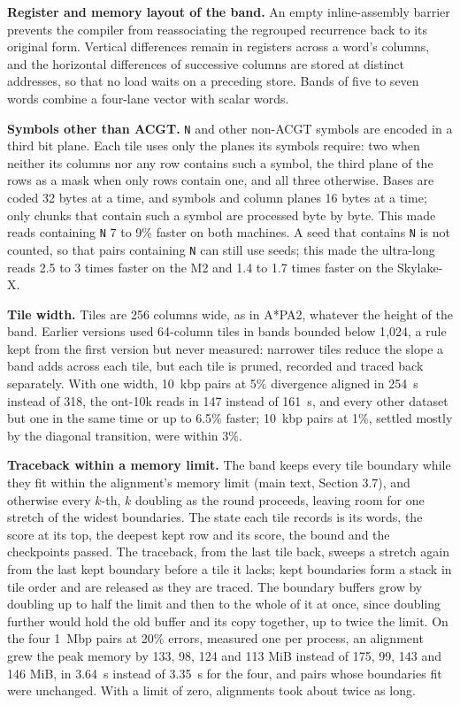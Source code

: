 \documentclass[10pt]{article}
\begin{document}
\textbf{Register and memory layout of the band.} An empty inline-assembly barrier prevents the compiler from reassociating the regrouped recurrence back to its original form. Vertical differences remain in registers across a word's columns, and the horizontal differences of successive columns are stored at distinct addresses, so that no load waits on a preceding store. Bands of five to seven words combine a four-lane vector with scalar words.

\textbf{Symbols other than ACGT.} \texttt{N} and other non-ACGT symbols are encoded in a third bit plane. Each tile uses only the planes its symbols require: two when neither its columns nor any row contains such a symbol, the third plane of the rows as a mask when only rows contain one, and all three otherwise. Bases are coded 32 bytes at a time, and symbols and column planes 16 bytes at a time; only chunks that contain such a symbol are processed byte by byte. This made reads containing \texttt{N} 7 to 9\% faster on both machines. A seed that contains \texttt{N} is not counted, so that pairs containing \texttt{N} can still use seeds; this made the ultra-long reads 2.5 to 3 times faster on the M2 and 1.4 to 1.7 times faster on the Skylake-X.

\textbf{Tile width.} Tiles are 256 columns wide, as in A*PA2, whatever the height of the band. Earlier versions used 64-column tiles in bands bounded below 1{,}024, a rule kept from the first version but never measured: narrower tiles reduce the slope a band adds across each tile, but each tile is pruned, recorded and traced back separately. With one width, 10~kbp pairs at 5\% divergence aligned in 254~\textmu s instead of 318, the ont-10k reads in 147 instead of 161~\textmu s, and every other dataset but one in the same time or up to 6.5\% faster; 10~kbp pairs at 1\%, settled mostly by the diagonal transition, were within 3\%.

\textbf{Traceback within a memory limit.} The band keeps every tile boundary while they fit within the alignment's memory limit (main text, Section 3.7), and otherwise every \(k\)-th, \(k\) doubling as the round proceeds, leaving room for one stretch of the widest boundaries. The state each tile records is its words, the score at its top, the deepest kept row and its score, the bound and the checkpoints passed. The traceback, from the last tile back, sweeps a stretch again from the last kept boundary before a tile it lacks; kept boundaries form a stack in tile order and are released as they are traced. The boundary buffers grow by doubling up to half the limit and then to the whole of it at once, since doubling further would hold the old buffer and its copy together, up to twice the limit. On the four 1~Mbp pairs at 20\% errors, measured one per process, an alignment grew the peak memory by 133, 98, 124 and 113 MiB instead of 175, 99, 143 and 146 MiB, in 3.64~s instead of 3.35~s for the four, and pairs whose boundaries fit were unchanged. With a limit of zero, alignments took about twice as long.
\end{document}
